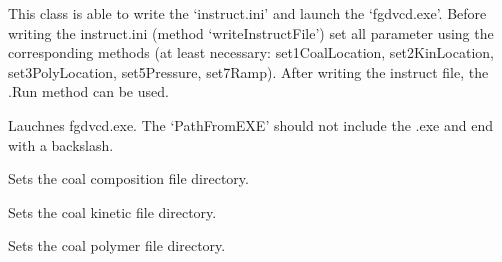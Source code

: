 \documentclass[letterpaper,10pt,english]{sphinxmanual}
\begin{document}
\begin{fulllineitems}
\label{FGDVCClasses:FGDVC_SetAndLaunch.SetterAndLauncher}
This class is able to write the `instruct.ini' and launch the `fgdvcd.exe'. Before writing the instruct.ini (method `writeInstructFile') set all parameter using the corresponding methods (at least necessary: set1CoalLocation, set2KinLocation, set3PolyLocation, set5Pressure, set7Ramp). After writing the instruct file, the .Run method can be used.

\begin{fulllineitems}
\label{FGDVCClasses:FGDVC_SetAndLaunch.SetterAndLauncher.Run}
Lauchnes fgdvcd.exe. The `PathFromEXE' should not include the .exe and end with a backslash.

\end{fulllineitems}


\begin{fulllineitems}
\label{FGDVCClasses:FGDVC_SetAndLaunch.SetterAndLauncher.set1CoalLocation}
Sets the coal composition file directory.

\end{fulllineitems}


\begin{fulllineitems}
\label{FGDVCClasses:FGDVC_SetAndLaunch.SetterAndLauncher.set2KinLocation}
Sets the coal kinetic file directory.

\end{fulllineitems}


\begin{fulllineitems}
\label{FGDVCClasses:FGDVC_SetAndLaunch.SetterAndLauncher.set3PolyLocation}
Sets the coal polymer file directory.

\end{fulllineitems}


\end{fulllineitems}
\end{document}
